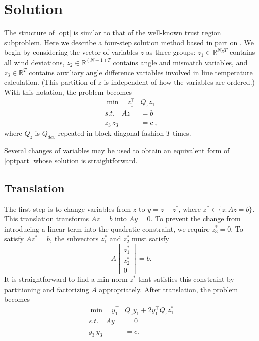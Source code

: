 \documentclass[conference]{IEEEtran}
\begin{document}
\section{Solution}\label{sec:solution}

The structure of \eqref{opt} is similar to that of the well-known trust region subproblem. Here we describe a four-step solution method based in part on \cite{bienstock2014}. We begin by considering the vector of variables $z$ as three groups: $z_1\in\mathbb{R}^{N_RT}$ contains all wind deviations, $z_2\in\mathbb{R}^{(N+1)T}$ contains angle and mismatch variables, and $z_3\in\mathbb{R}^T$ contains auxiliary angle difference variables involved in line temperature calculation. (This partition of $z$ is independent of how the variables are ordered.) With this notation, the problem becomes
\begin{subequations}\label{optpart}
\begin{align}
\min\quad z_1^\top &Q_z z_1 \\
s.t.\quad Az &= b \\
z_3^\top z_3 &= c~,
\end{align}
\end{subequations}
where $Q_z$ is $Q_{dev}$ repeated in block-diagonal fashion $T$ times.

Several changes of variables may be used to obtain an equivalent form
of \eqref{optpart} whose solution is straightforward.

\subsection{Translation}

The first step is to change variables from $z$ to $y=z-z^*$, where
$z^*\in\{z:Az=b\}$. This translation transforms $Az=b$ into $Ay=0$. To
prevent the change from introducing a linear term into the quadratic
constraint, we require $z_3^*=0$. To satisfy $Az^*=b$, the subvectors
$z_1^*$ and $z_2^*$ must satisfy
\[
A \begin{bmatrix} z_1^* \\ z_2^*
\\ 0 \end{bmatrix} = b.
\]
It is straightforward to find a min-norm $z^*$ that satisfies this
constraint by partitioning and factorizing $A$ appropriately. After
translation, the problem becomes
\begin{subequations}\label{opt2}
\begin{align}
\label{opt2:obj} \min\quad y_1^\top &Q_z y_1 + 2 y_1^\top Q_z z_1^* \\
\label{opt2:lin} s.t.\quad Ay &= 0 \\
\label{opt2:quad} y_3^\top y_3 &= c.
\end{align}
\end{subequations}
\end{document}
